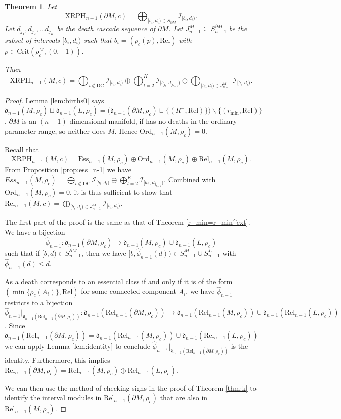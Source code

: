 \documentclass[a4paper,11pt]{article}
\newtheorem{theorem}{Theorem}[section]
\theoremstyle{definition}
\newcommand{\Rel}{\textrm{Rel}}
\newcommand{\Ord}{\textrm{Ord}}
\newcommand{\Ess}{\textrm{Ess}}
\newcommand{\DC}{\text{DC}}
\newcommand{\death}{\mathfrak{d}}
\begin{document}
\begin{theorem}\label{dim}
Let $$\text{XRPH}_{n-1}(\partial M, c) = \bigoplus_{[b_i,d_i)\in S_{\partial M}} \mathcal{I}_{[b_i,d_i)}.$$ 
Let $d_{j_1}, d_{j_2}, \ldots d_{j_K}$ be the death cascade sequence of $\partial M$.
Let $J_{n-1}^M\subseteq S_{n-1}^{\partial M}$ be the subset of intervals $[b_i,d_i)$ such that $b_i = (\rho_c(p),\text{Rel})$ with $p\in\text{Crit}(\rho_c^M,(0,-1))$.


Then 
$$\text{XRPH}_{n-1}(M, c)=\bigoplus_{i\notin \DC} \mathcal{I}_{[b_i, d_i)} \oplus \bigoplus_{l=2}^{K}\mathcal{I}_{[b_{j_l}, d_{j_{l-1}})}\oplus \bigoplus_{[b_i,d_i)\in J_{n-1}^M}\mathcal{I}_{[b_i, d_i)}.$$
\end{theorem}
\begin{proof}
Lemma \ref{lem:births0} says
$\mathfrak{d}_{n-1}(M,\rho_c)\sqcup  \mathfrak{d}_{n-1}(L,\rho_c)= \big(\mathfrak{d}_{n-1}(\partial M,\rho_c)\sqcup \{(R^-,\text{Rel})\} \big)\backslash \{(r_{\min},\text{Rel})\}$. $\partial M$ is an $(n-1)$ dimensional manifold, if has no deaths in the ordinary parameter range, so neither does $M$. Hence $\Ord_{n-1}(M, \rho_c)=0$. 

Recall that $$\text{XRPH}_{n-1}(M, c)=\Ess_{n-1}(M, \rho_c)\oplus \Ord_{n-1}(M, \rho_c) \oplus \Rel_{n-1}(M, \rho_c).$$ From Proposition \ref{prop:ess_n-1} we have $Ess_{n-1}(M,\rho_c)=\bigoplus_{i\notin \DC} \mathcal{I}_{[b_i, d_i)} \oplus \bigoplus_{l=2}^{K}\mathcal{I}_{[b_{j_l}, d_{j_{l-1}})}.$ Combined with $\Ord_{n-1}(M, \rho_c)=0$,
it is thus sufficient to show that $\text{Rel}_{n-1}(M, c)=\bigoplus_{[b_i,d_i)\in J_{n-1}^M}\mathcal{I}_{[b_i, d_i)}.$


The first part of the proof is the same as that of Theorem \ref{r_min=r_min^ext}. We have a bijection $$\hat{\phi}_{n-1}: \death_{n-1}(\partial M, \rho_c) \to \death_{n-1}(M, \rho_c)\cup \death_{n-1}(L, \rho_c)$$ 
such that if $[b,d)\in S_{n-1}^{\partial M}$, then we have
$[b,\hat{\phi}_{n-1}(d))\in S_{n-1}^{M}\cup S_{n-1}^{L}$ with $\hat{\phi}_{n-1}(d)\leq d$.

As a death corresponds to an essential class if and only if it is of the form $(\min\{\rho_c(A_i)\},\Rel)$ for some connected component $A_i$, we have $\hat{\phi}_{n-1}$ restricts to a bijection $\hat{\phi}_{n-1}|_{\death_{n-1}(\Rel_{n-1}(\partial M, \rho_c))}: \death_{n-1}(\Rel_{n-1}(\partial M, \rho_c)) \to \death_{n-1}(\Rel_{n-1}(M, \rho_c))\cup \death_{n-1}(\Rel_{n-1}(L, \rho_c))$.
Since $$\death_{n-1}(\Rel_{n-1}(\partial M, \rho_c))=\death_{n-1}(\Rel_{n-1}(M, \rho_c))\cup \death_{n-1}(\Rel_{n-1}(L, \rho_c))$$ we can apply Lemma \ref{lem:identity} to conclude $\hat{\phi}_{n-1}|_{\death_{n-1}(\Rel_{n-1}(\partial M, \rho_c))}$ is the identity. Furthermore, this implies $\Rel_{n-1}(\partial M,\rho_c)=\Rel_{n-1}(M, \rho_c)\oplus \Rel_{n-1}(L,\rho_c)$. 

We can then use the method of checking signs in the proof of Theorem \ref{thm:k} to identify the interval modules in $\Rel_{n-1}(\partial M,\rho_c)$ that are also in $\Rel_{n-1}(M, \rho_c)$. 
\end{proof}
\end{document}
